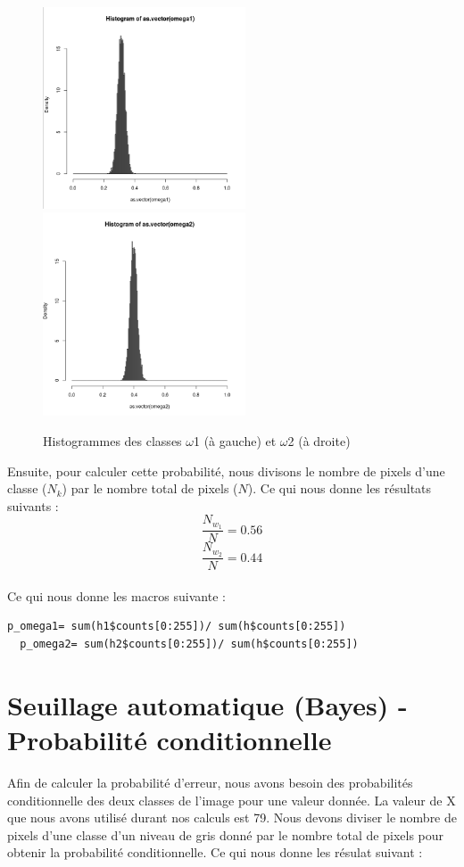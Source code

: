 \documentclass[a4paper,11pt]{article}
\begin{document}
  \begin{figure}[H]
    \center
    \includegraphics[width=6cm]{resultat/hist_omega1.png}
    \includegraphics[width=6cm]{resultat/hist_omega2.png}
    \caption{Histogrammes des classes $\omega$1 (à gauche) et $\omega$2 (à droite)}
  \end{figure}
  
  Ensuite, pour calculer cette probabilité, nous divisons le nombre de pixels d'une classe ($N_k$) par
  le nombre total de pixels ($N$). Ce qui nous donne les résultats suivants :
  $$\frac{N_{w_1}}{N} = 0.56$$
  $$\frac{N_{w_2}}{N} = 0.44$$\\
  
  Ce qui nous donne les macros suivante :\\
  
  \begin{lstlisting}[caption=Macros de calcule de probabilité à priori des classe $N_{w_1}$ et $N_{w_2}$]
  p_omega1= sum(h1$counts[0:255])/ sum(h$counts[0:255])
  p_omega2= sum(h2$counts[0:255])/ sum(h$counts[0:255])\end{lstlisting}
  
  \section{Seuillage automatique (Bayes) - Probabilité conditionnelle}
  Afin de calculer la probabilité d'erreur, nous avons besoin des probabilités conditionnelle des deux
  classes de l'image pour une valeur donnée. La valeur de X que nous avons utilisé durant nos calculs
  est 79. Nous devons diviser le nombre de pixels d'une classe d'un niveau de gris donné par le nombre total de
  pixels pour obtenir la probabilité conditionnelle. Ce qui nous donne les résulat suivant :
  
\end{document}
